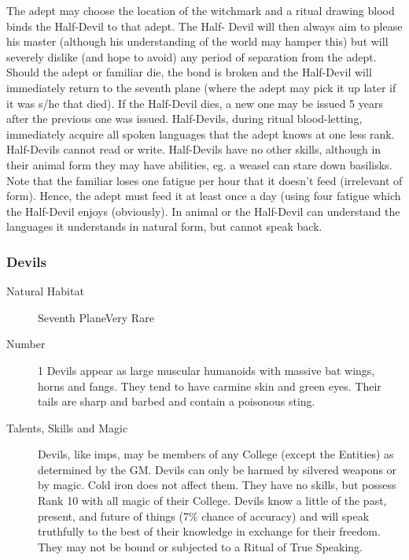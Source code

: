 \begin{multicols}{2}
\begin{description}
The adept may choose the location of the witchmark and a ritual
drawing blood binds the Half-Devil to that adept.  The Half- Devil
will then always aim to please his master (although his understanding
of the world may hamper this) but will severely dislike (and hope to
avoid) any period of separation from the adept.  Should the adept or
familiar die, the bond is broken and the Half-Devil will immediately
return to the seventh plane (where the adept may pick it up later if
it was s/he that died).  If the Half-Devil dies, a new one may be
issued 5 years after the previous one was issued.  Half-Devils, during
ritual blood-letting, immediately acquire all spoken languages that
the adept knows at one less rank.  Half-Devils cannot read or write.
Half-Devils have no other skills, although in their animal form they
may have abilities, eg.  a weasel can stare down basilisks.  Note that
the familiar loses one fatigue per hour that it doesn't feed
(irrelevant of form).  Hence, the adept must feed it at least once a
day (using four fatigue which the Half-Devil enjoys (obviously).  In
animal or the Half-Devil can understand the languages it understands
in natural form, but cannot speak back.

\end{description}

\subsubsection{Devils}

\begin{description}
\item[Natural Habitat]Seventh PlaneVery Rare

\item[Number] 1
Devils appear as large muscular humanoids with
massive bat wings, horns and fangs.  They tend to have carmine skin
and green eyes.  Their tails are sharp and barbed and contain a
poisonous sting.

\item[Talents, Skills and Magic]Devils, like imps, may be members of any College (except the
Entities) as determined by the GM. Devils can only be harmed by
silvered weapons or by magic.  Cold iron does not affect them.  They
have no skills, but possess Rank 10 with all magic of their College.
Devils know a little of the past, present, and future of things
(7\% chance of accuracy) and will speak truthfully to the best of
their knowledge in exchange for their freedom.  They may not be bound
or subjected to a Ritual of True Speaking.


\end{description}
\end{multicols}
